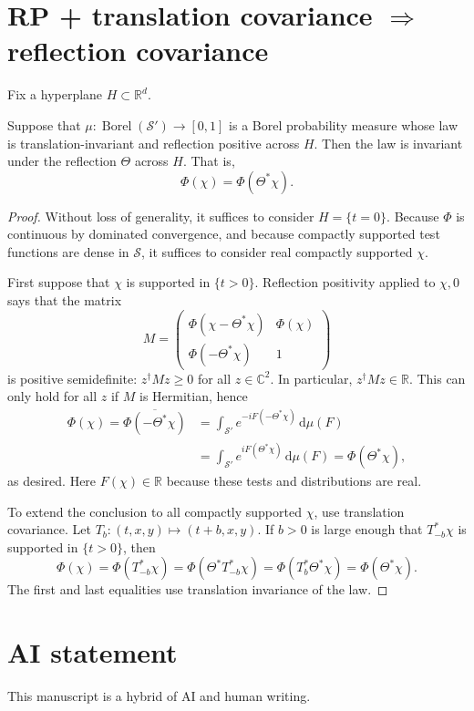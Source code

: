 \documentclass[11pt, letterpaper, reqno]{amsart}
\theoremstyle{definition}
\newenvironment{proposition}
{\pushQED{\qed}\renewcommand{\qedsymbol}{$\blacksquare$}\propositionx}
{\popQED\endpropositionx}
\theoremstyle{remark}
\newcommand{\bbC}{\mathbb{C}}
\newcommand{\bbR}{\mathbb{R}}
\newcommand{\calS}{\mathcal{S}}
\newcommand{\dd}{\,\mathrm{d}}
\begin{document}
\section{RP + translation covariance \texorpdfstring{$\Rightarrow$}{implies} reflection covariance}

Fix a hyperplane $H\subset\bbR^d$.

\begin{proposition}\label{prop:refl}
Suppose that $\mu:\operatorname{Borel}(\calS')\to[0,1]$ is a Borel
probability measure whose law is translation-invariant and reflection
positive across $H$. Then the law is invariant under the reflection
$\Theta$ across $H$. That is,
\begin{equation}
 \Phi(\chi)=\Phi(\Theta^*\chi).
\end{equation}
\end{proposition}
\begin{proof}
Without loss of generality, it suffices to consider $H=\{t=0\}$.
Because $\Phi$ is continuous by dominated convergence, and because
compactly supported test functions are dense in $\calS$, it suffices
to consider real compactly supported $\chi$.

First suppose that $\chi$ is supported in $\{t>0\}$. Reflection
positivity applied to $\chi,0$ says that the matrix
\begin{equation}
 M=\begin{pmatrix}
 \Phi(\chi-\Theta^*\chi)&\Phi(\chi)\\
 \Phi(-\Theta^*\chi)&1
 \end{pmatrix}
\end{equation}
is positive semidefinite: $z^\dagger Mz\geq0$ for all $z\in\bbC^2$.
In particular, $z^\dagger Mz\in\bbR$. This can only hold for all $z$
if $M$ is Hermitian, hence
\begin{align*}
 \Phi(\chi)=\overline{\Phi(-\Theta^*\chi)}
 &=\int_{\calS'}e^{-iF(-\Theta^*\chi)}\dd\mu(F)\\
 &=\int_{\calS'}e^{iF(\Theta^*\chi)}\dd\mu(F)
 =\Phi(\Theta^*\chi),
\end{align*}
as desired. Here $F(\chi)\in\bbR$ because these tests and
distributions are real.

To extend the conclusion to all compactly supported $\chi$, use
translation covariance. Let $T_b:(t,x,y)\mapsto(t+b,x,y)$. If $b>0$
is large enough that $T_{-b}^*\chi$ is supported in $\{t>0\}$, then
\begin{equation}
 \Phi(\chi)=\Phi(T_{-b}^*\chi)
 =\Phi(\Theta^*T_{-b}^*\chi)
 =\Phi(T_b^*\Theta^*\chi)=\Phi(\Theta^*\chi).
\end{equation}
The first and last equalities use translation invariance of the law.
\end{proof}

\section*{AI statement}

This manuscript is a hybrid of AI and human writing.

\printbibliography
\end{document}
